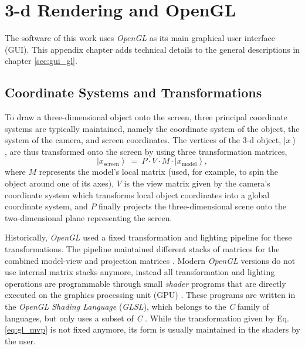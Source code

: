 %
%

\chapter{3-d Rendering and OpenGL}
\label{ch:gl}

The software of this work uses \textit{OpenGL} \cite{web_OpenGL} as its main graphical user interface (GUI).
This appendix chapter adds technical details to the general descriptions in chapter \ref{sec:gui_gl}.



\section{Coordinate Systems and Transformations}

To draw a three-dimensional object onto the screen, three principal coordinate systems are typically maintained,
namely the coordinate system of the object, the system of the camera, and screen coordinates.
The vertices of the 3-d object, $\left|x\right>$ , are thus transformed onto the screen by using three
transformation matrices,
\begin{equation}
	\left|x_{\mathrm{screen}}\right> \ =\ P \cdot V \cdot  M \cdot  \left| x_{\mathrm{model}} \right>,
	\label{eq:gl_mvp}
\end{equation}
where $M$ represents the model's local matrix (used, for example, to spin the object around one of its axes),
$V$ is the view matrix given by the camera's coordinate system which transforms local object coordinates into
a global coordinate system, and $P$ finally projects the three-dimensional scene onto the two-dimensional plane
representing the screen.

Historically, \textit{OpenGL} used a fixed transformation and lighting pipeline \cite{wiki_gl_history} for
these transformations. The pipeline maintained different stacks of matrices for the combined model-view and
projection matrices \cite{web_gl_matrixmode}.
Modern \textit{OpenGL} versions do not use internal matrix stacks anymore, instead all transformation
and lighting operations are programmable through small \textit{shader} programs that are directly executed on
the graphics processing unit (GPU) \cite{wiki_gl_history}. These programs are written in the
\textit{OpenGL Shading Language} (\textit{GLSL}), which belongs to the \textit{C} family of languages, but
only uses a subset of \textit{C} \cite{wiki_glsl}.
While the transformation given by Eq. \ref{eq:gl_mvp} is not fixed anymore, its form is usually maintained
in the shaders by the user.




